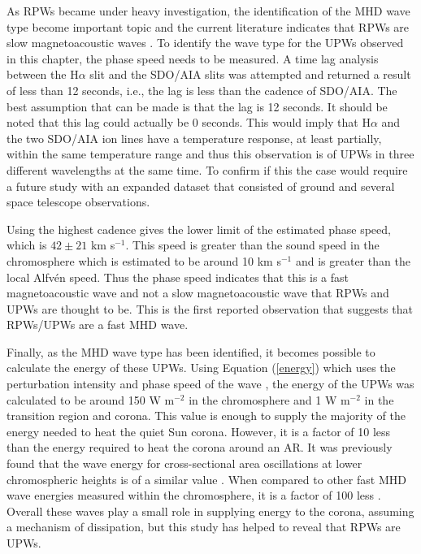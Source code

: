 	As RPWs became under heavy investigation, the identification of the MHD wave type become important topic and the current literature indicates that RPWs are slow magnetoacoustic waves \citep{Bloomfiel2008}.
	To identify the wave type for the UPWs observed in this chapter, the phase speed needs to be measured.
	A time lag analysis between the H$\alpha$ slit and the SDO/AIA slits was attempted and returned a result of less than 12 seconds, i.e., the lag is less than the cadence of SDO/AIA.
	The best assumption that can be made is that the lag is 12 seconds.
	It should be noted that this lag could actually be 0 seconds. 
	This would imply that H$\alpha$ and the two SDO/AIA ion lines have a temperature response, at least partially, within the same temperature range and thus this observation is of UPWs in three different wavelengths at the same time. 
	To confirm if this the case would require a future study with an expanded dataset that consisted of ground and several space telescope observations.
	
	Using the highest cadence gives the lower limit of the estimated phase speed, which is $42\pm21$ km s$^{-1}$.
	This speed is greater than the sound speed in the chromosphere which is estimated to be around 10 km s$^{-1}$ \citep{Morton2012} and is greater than the local Alfv\'en speed.
	Thus the phase speed indicates that this is a fast magnetoacoustic wave and not a slow magnetoacoustic wave that RPWs and UPWs are thought to be.
    This is the first reported observation that suggests that RPWs/UPWs are a fast MHD wave.
    
    Finally, as the MHD wave type has been identified, it becomes possible to calculate the energy of these UPWs.
    Using Equation (\ref{energy}) which uses the perturbation intensity and phase speed of the wave \citep{Kitagawa2010}, the energy of the UPWs was calculated to be around 150 W m$^{-2}$ in the chromosphere and 1 W m$^{-2}$ in the transition region and corona.
    This value is enough to supply the majority of the energy needed to heat the quiet Sun corona.
    However, it is a factor of 10 less than the energy required to heat the corona around an AR.
    It was previously found that the wave energy for cross-sectional area oscillations at lower chromospheric heights is of a similar value  \citep{0004-637X-806-1-132}. 
    When compared to other fast MHD wave energies measured within the chromosphere, it is a factor of 100 less \citep{Morton2012}. 
    Overall these waves play a small role in supplying energy to the corona, assuming a mechanism of dissipation, but this study has helped to reveal that RPWs are UPWs.
    
